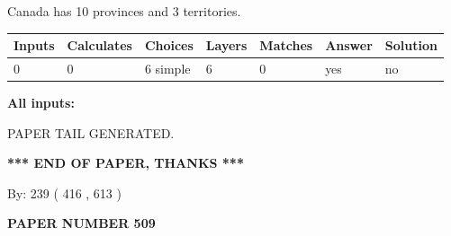 \documentclass[12pt]{article}
\begin{document}
 
\noindent{}
 
 
Canada has 10  provinces and 3 territories.
 
 
\noindent{}
 
 
   
   
   
   
\noindent\begin{tabular}{|l|l|l|l|l|l|l|}
 \hline
Inputs & Calculates & Choices & Layers & Matches & Answer & Solution \\ \hline
 0  & 
 0  & 
 6
  simple  
  & 
 6  & 
 0  & 
  yes & 
  no 
  \\ \hline
 \end{tabular}
   
   
   
   
\noindent{}
   
   
   
   
\noindent\vspace{0.1in}\hspace{-0.08in} {\textbf{\Large{All inputs: }}}
   
   
   
   
   
   
 \vspace{0.2in}
 
   
   
\vspace{2.0in} PAPER TAIL GENERATED.
   
   
   
   
\vspace{1.0in} 
{\textbf{\large{ *** END OF PAPER, THANKS *** }}} 
   
   
\hspace{1.0in} By: 
 239 ( 416 ,  613 )
   
   
   
   
\newpage 
\setcounter{page}{ 
   509001 } 
   
   
   
   
 {\textbf{ \Large{ PAPER NUMBER  509  }}}
   
   
\vspace{0.2in}
   
   
   
\end{document}
